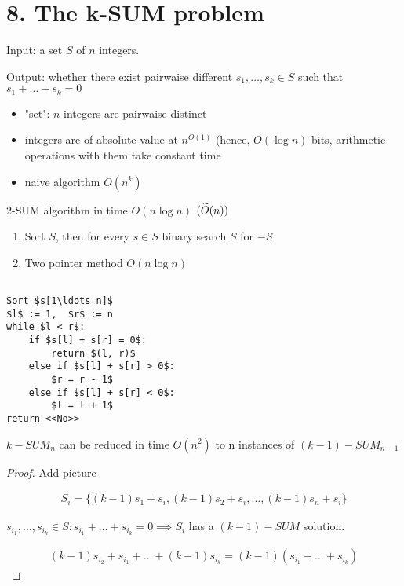 \section{8. The k-SUM problem}

\begin{df}
	Input: a set $S$ of $n$ integers.

	Output: whether there exist pairwaise different $s_1, \ldots, s_k \in S$ such that $s_1 + \ldots + s_k = 0$

\end{df}

\begin{remrk}

	\begin{itemize}
		\item "set": $n$ integers are pairwaise distinct
		\item integers are of absolute value at $n^{O(1)}$ (hence, $O(\log n)$ bits, arithmetic operations with them take constant time
		\item naive algorithm $O(n^k)$
	\end{itemize}
\end{remrk}

\begin{thm}
	2-SUM algorithm in time $O(n \log n)$ $(\widetilde{O} (n))$
\end{thm}

\begin{algorithm}
	\begin{enumerate}
		\item Sort $S$, then for every $s \in S$ binary search $S $ for $-S $
		\item Two pointer method $O(n \log n)$
	\end{enumerate}
\end{algorithm}

\begin{lstlisting}

Sort $s[1\ldots n]$
$l$ := 1,  $r$ := n 
while $l < r$: 
    if $s[l] + s[r] = 0$: 
        return $(l, r)$ 
    else if $s[l] + s[r] > 0$: 
        $r = r - 1$ 
    else if $s[l] + s[r] < 0$: 
        $l = l + 1$  
return <<No>>

\end{lstlisting}

\begin{lm}
	$k-SUM_n$ can be reduced in time $O(n^2)$ to n instances of $(k - 1)-SUM_{n - 1}$
\end{lm}

\begin{proof}
	{\color{red} Add picture}

	\begin{align*}
		S_i = \{(k - 1)s_1 + s_i, (k - 1)s_2 + s_i, \ldots, (k - 1)s_n + s_i \}
	\end{align*}

	$s_{i_1}, \ldots, s_{i_k} \in S: s_{i_1} + \ldots + s_{i_k} = 0 \implies S_i $ has a $(k - 1)-SUM$ solution.

	\begin{align*}
		(k - 1)s_{i_2} + s_{i_1} + \ldots + (k - 1)s_{i_k} = (k - 1)(s_{i_1} + \ldots + s_{i_k})
	\end{align*}
\end{proof}

